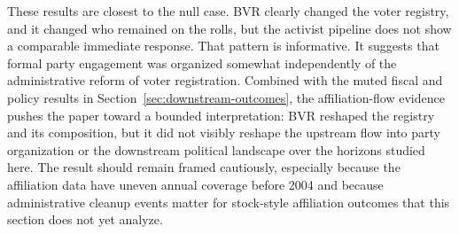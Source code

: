 These results are closest to the null case. BVR clearly changed the voter registry, and it changed who remained on the rolls, but the activist pipeline does not show a comparable immediate response. That pattern is informative. It suggests that formal party engagement was organized somewhat independently of the administrative reform of voter registration. Combined with the muted fiscal and policy results in Section~\ref{sec:downstream-outcomes}, the affiliation-flow evidence pushes the paper toward a bounded interpretation: BVR reshaped the registry and its composition, but it did not visibly reshape the upstream flow into party organization or the downstream political landscape over the horizons studied here. The result should remain framed cautiously, especially because the affiliation data have uneven annual coverage before 2004 and because administrative cleanup events matter for stock-style affiliation outcomes that this section does not yet analyze.
